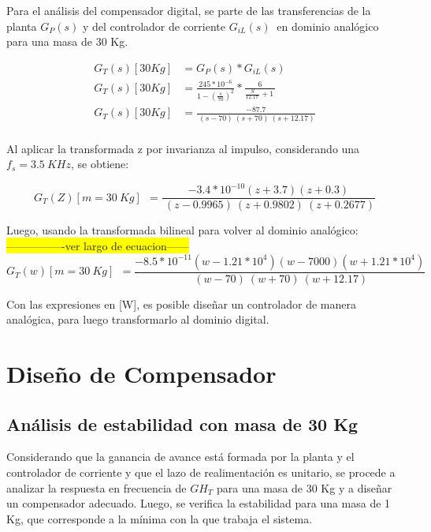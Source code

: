 \noindent Para el an\'{a}lisis del compensador digital, se parte de las transferencias de la planta $G_P(s)$ y del controlador de corriente $G_{iL}(s)\ $ en dominio anal\'{o}gico para una masa de 30 Kg.

\begin{equation} 
	\begin{aligned}
	G_T(s)[30Kg]&=G_P(s)*G_{iL}(s)\\
	G_T(s)[30Kg]&=\frac{245*{10}^{-6}}{{1-(\frac{s}{70})}^2}*\frac{6}{\frac{S}{12.17\ }+1\ }\\
	G_T(s)[30Kg]&=\frac{-87.7}{\ (s-70)\ (s+70)\ (s+12.17)}\\
	\end{aligned}
\end{equation}

\noindent Al aplicar la transformada z por invarianza al impulso, considerando una $f_s=3.5\ KHz$, se obtiene:

\begin{equation} 
	G_T(Z)[m=30\ Kg]\ \ =\frac{-3.4*10^{-10}(z+3.7)(z+0.3)}{\ (z-0.9965)\ (z+0.9802)\ (z+0.2677)}
\end{equation}

\noindent Luego, usando la transformada bilineal para volver al dominio anal\'{o}gico:
\\
 \colorbox{yellow}{----------------ver largo de ecuacion------}
\begin{equation} 
	G_T(w)[m=30\ Kg]\ \ =\frac{-8.5*10^{-11}(w-1.21*10^4)(w-7000)(w+1.21*10^4)}{\ (w-70)\ (w+70)\ (w+12.17)}
\end{equation}


\noindent Con las expresiones en [W], es posible dise\~{n}ar un controlador de manera anal\'{o}gica, para luego transformarlo al dominio digital.


\section{Diseño de Compensador}

\subsection{Análisis de estabilidad con masa de 30 Kg}

\noindent Considerando que la ganancia de avance est\'{a} formada por la planta y el controlador de corriente y que el lazo de realimentaci\'{o}n es unitario, se procede a analizar la respuesta en frecuencia de ${GH}_T$ para una masa de 30 Kg y a dise\~{n}ar un compensador adecuado. Luego, se verifica la estabilidad para una masa de 1 Kg, que corresponde a la m\'{i}nima con la que trabaja el sistema.
 
